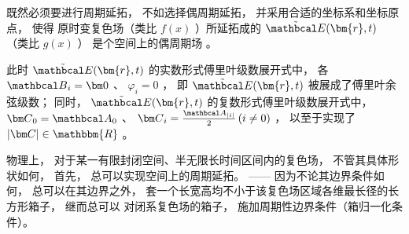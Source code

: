 既然必须要进行周期延拓， 不如选择偶周期延拓， 并采用合适的坐标系和坐标原点， 使得
原时变复色场（类比 $ f(x) $ ）所延拓成的 $ \tilde {{\mathbcal E}}(\bm{r},t) $ （类比 $ g(x) $ ）
是个空间上的偶周期场
。

此时 $ \tilde {{\mathbcal E}}(\bm{r},t) $ 的实数形式傅里叶级数展开式中， 各 $ {\mathbcal B}_i = {\bm 0} $ 、 $ \varphi_i = 0 $ ， 
即 $ \tilde {{\mathbcal E}}(\bm{r},t) $ 被展成了傅里叶余弦级数； 同时， $ \tilde {{\mathbcal E}}(\bm{r},t) $ 
的复数形式傅里叶级数展开式中， 
$ {\bm C}_0 = {\mathbcal A}_0 $ 、 $ {\bm C}_i = \frac{{\mathbcal A}_{\left| i \right|}}{2} \left( {i \ne 0} \right) $ 
， 以至于实现了 $ \left| {\bm C} \right| \in \mathbbm{R} $ 。

物理上， 对于某一有限封闭空间、半无限长时间区间内的复色场， 不管其具体形状如何， 首先， 总可以实现空间上的周期延拓。 
—— 因为不论其边界条件如何， 总可以在其边界之外， 套一个长宽高均不小于该复色场区域各维最长径的长方形箱子， 
继而总可以
对闭系复色场的箱子， 施加周期性边界条件（箱归一化条件）。 





